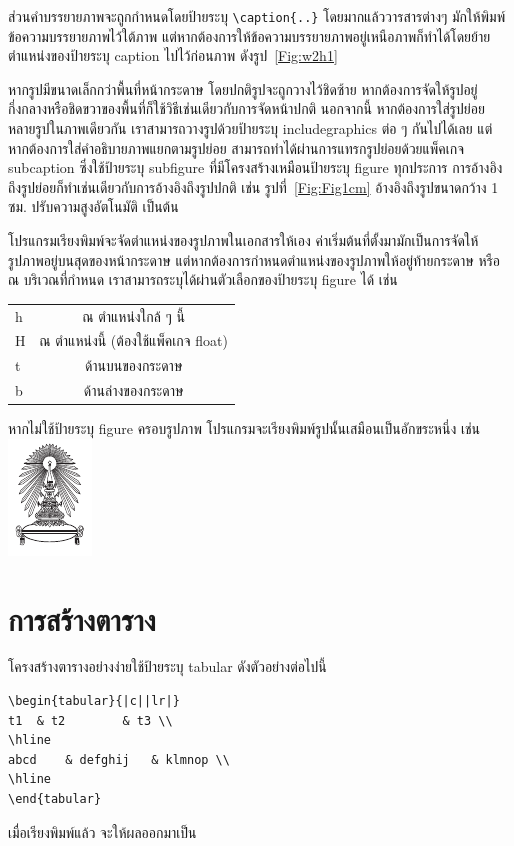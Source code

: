 ส่วนคำบรรยายภาพจะถูกกำหนดโดยป้ายระบุ \lstinline|\caption{..}| โดยมากแล้ววารสารต่างๆ มักให้พิมพ์ข้อความบรรยายภาพไว้ใต้ภาพ แต่หากต้องการให้ข้อความบรรยายภาพอยู่เหนือภาพก็ทำได้โดยย้ายตำแหน่งของป้ายระบุ caption ไปไว้ก่อนภาพ ดังรูป~\ref{Fig:w2h1}

หากรูปมีขนาดเล็กกว่าพื้นที่หน้ากระดาษ โดยปกติรูปจะถูกวางไว้ชิดซ้าย หากต้องการจัดให้รูปอยู่กึ่งกลางหรือชิดขวาของพื้นที่ก็ใช้วิธีเช่นเดียวกับการจัดหน้าปกติ นอกจากนี้ หากต้องการใส่รูปย่อยหลายรูปในภาพเดียวกัน เราสามารถวางรูปด้วยป้ายระบุ includegraphics ต่อ ๆ กันไปได้เลย แต่หากต้องการใส่คำอธิบายภาพแยกตามรูปย่อย สามารถทำได้ผ่านการแทรกรูปย่อยด้วยแพ็คเกจ subcaption ซึ่งใช้ป้ายระบุ subfigure ที่มีโครงสร้างเหมือนป้ายระบุ figure ทุกประการ การอ้างอิงถึงรูปย่อยก็ทำเช่นเดียวกับการอ้างอิงถึงรูปปกติ เช่น รูปที่~\ref{Fig:Fig1cm} อ้างอิงถึงรูปขนาดกว้าง 1 ซม. ปรับความสูงอัตโนมัติ เป็นต้น

โปรแกรมเรียงพิมพ์จะจัดตำแหน่งของรูปภาพในเอกสารให้เอง ค่าเริ่มต้นที่ตั้งมามักเป็นการจัดให้รูปภาพอยู่บนสุดของหน้ากระดาษ แต่หากต้องการกำหนดตำแหน่งของรูปภาพให้อยู่ท้ายกระดาษ หรือ ณ บริเวณที่กำหนด เราสามารถระบุได้ผ่านตัวเลือกของป้ายระบุ figure ได้ เช่น

\begin{tabular}{lc}
	h    & ณ ตำแหน่งใกล้ ๆ นี้\\
	H    & ณ ตำแหน่งนี้ (ต้องใช้แพ็คเกจ float) \\
	t    & ด้านบนของกระดาษ \\
	b    & ด้านล่างของกระดาษ
\end{tabular}

หากไม่ใช้ป้ายระบุ figure ครอบรูปภาพ โปรแกรมจะเรียงพิมพ์รูปนั้นเสมือนเป็นอักขระหนึ่ง เช่น \includegraphics[width=.05\textwidth]{Figures/Prakeaw-Black}

\section{การสร้างตาราง}
โครงสร้างตารางอย่างง่ายใช้ป้ายระบุ tabular ดังตัวอย่างต่อไปนี้
\begin{lstlisting}[numbers=none]
\begin{tabular}{|c||lr|}
t1	& t2		& t3 \\
\hline
abcd	& defghij	& klmnop \\
\hline
\end{tabular}
\end{lstlisting}
เมื่อเรียงพิมพ์แล้ว จะให้ผลออกมาเป็น


